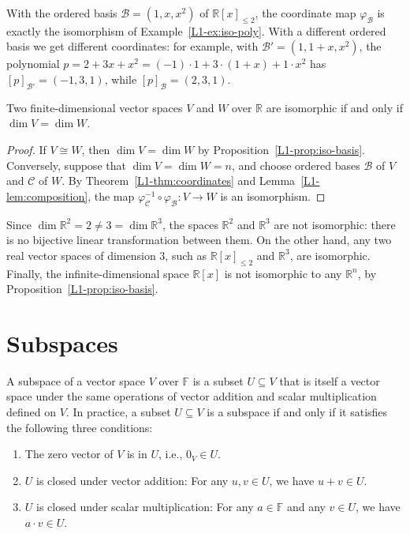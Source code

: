 \begin{example}
    With the ordered basis $\mathcal{B} = (1, x, x^2)$ of $\mathbb{R}[x]_{\leq 2}$, the coordinate map $\varphi_{\mathcal{B}}$ is exactly the isomorphism of Example~\ref{L1-ex:iso-poly}. With a different ordered basis we get different coordinates: for example, with $\mathcal{B}' = (1, 1 + x, x^2)$, the polynomial $p = 2 + 3x + x^2 = (-1) \cdot 1 + 3 \cdot (1 + x) + 1 \cdot x^2$ has $[p]_{\mathcal{B}'} = (-1, 3, 1)$, while $[p]_{\mathcal{B}} = (2, 3, 1)$.
\end{example}

\begin{corollary}\label{L1-cor:iso-dim}
    Two finite-dimensional vector spaces $V$ and $W$ over $\mathbb{R}$ are isomorphic if and only if $\dim V = \dim W$.
\end{corollary}

\begin{proof}
    If $V \cong W$, then $\dim V = \dim W$ by Proposition~\ref{L1-prop:iso-basis}. Conversely, suppose that $\dim V = \dim W = n$, and choose ordered bases $\mathcal{B}$ of $V$ and $\mathcal{C}$ of $W$. By Theorem~\ref{L1-thm:coordinates} and Lemma~\ref{L1-lem:composition}, the map $\varphi_{\mathcal{C}}^{-1} \circ \varphi_{\mathcal{B}}: V \to W$ is an isomorphism.
\end{proof}

\begin{example}
    Since $\dim \mathbb{R}^2 = 2 \neq 3 = \dim \mathbb{R}^3$, the spaces $\mathbb{R}^2$ and $\mathbb{R}^3$ are not isomorphic: there is no bijective linear transformation between them. On the other hand, any two real vector spaces of dimension $3$, such as $\mathbb{R}[x]_{\leq 2}$ and $\mathbb{R}^3$, are isomorphic. Finally, the infinite-dimensional space $\mathbb{R}[x]$ is not isomorphic to any $\mathbb{R}^n$, by Proposition~\ref{L1-prop:iso-basis}.
\end{example}

\section{Subspaces}\label{L1-sec:subspaces}

\begin{definition}[Subspace]\label{L1-def:subspace}
    A subspace of a vector space $V$ over $\mathbb{F}$ is a subset $U \subseteq V$ that is itself a vector space under the same operations of vector addition and scalar multiplication defined on $V$. In practice, a subset $U \subseteq V$ is a subspace if and only if it satisfies the following three conditions:
    \begin{enumerate}
        \item The zero vector of $V$ is in $U$, i.e., $0_V \in U$.
        \item $U$ is closed under vector addition: For any $u, v \in U$, we have $u + v \in U$.
        \item $U$ is closed under scalar multiplication: For any $a \in \mathbb{F}$ and any $v \in U$, we have $a \cdot v \in U$.
    \end{enumerate}
\end{definition}

